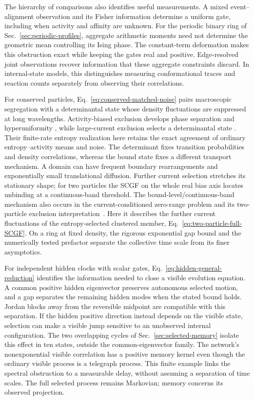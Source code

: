 \documentclass[aps,pre,reprint,amsmath,amssymb,longbibliography,floatfix]{revtex4-2}
\begin{document}
The hierarchy of comparisons also identifies useful measurements. A
mixed event--alignment observation and its Fisher information determine
a uniform gate, including when activity and affinity are unknown.
For the periodic binary ring of Sec.~\ref{sec:periodic-profiles}, aggregate
arithmetic moments need not determine the geometric mean controlling
its Ising phase. The constant-term
deformation makes this obstruction exact while keeping the gates real
and positive. Edge-resolved joint observations recover information that
these aggregate constraints discard. In internal-state models, this
distinguishes measuring conformational traces and reaction counts
separately from observing their correlations.

For conserved particles, Eq.~\eqref{eq:conserved-matched-noise} pairs
macroscopic segregation with a determinantal state whose density
fluctuations are suppressed at long wavelengths. Activity-biased exclusion develops phase separation and hyperuniformity
\cite{LecomteGarrahanVanWijland2012,JackThompsonSollich2015}, while
large-current exclusion selects a determinantal state
\cite{PopkovSchutzSimon2010}.
Their finite-rate entropy realization here retains the exact agreement
of ordinary entropy--activity means and noise. The determinant fixes
transition probabilities and density correlations, whereas the bound
state fixes a different transport mechanism. A domain can have frequent
boundary rearrangements and exponentially small translational diffusion.
Further current selection stretches its stationary shape; for two
particles the SCGF on the whole real bias axis locates unbinding at a
continuous-band threshold. The bound-level/continuous-band mechanism also occurs in the
current-conditioned zero-range problem and its two-particle exclusion
interpretation~\cite{RakosHarris2008}. Here it describes the further
current fluctuations of the entropy-selected clustered member,
Eq.~\eqref{eq:two-particle-full-SCGF}. On a ring at fixed density,
the rigorous exponential gap bound and the numerically tested prefactor
separate the collective time scale from its finer asymptotics.

For independent hidden clocks with scalar gates,
Eq.~\eqref{eq:hidden-general-reduction} identifies the information needed
to close a visible evolution equation. A common positive hidden eigenvector
preserves autonomous selected motion, and a gap separates the remaining
hidden modes when the stated bound holds. Jordan blocks away from the
reversible midpoint are compatible with this separation. If the hidden
positive direction instead depends on the visible state, selection can
make a visible jump sensitive to an unobserved internal configuration.
The two overlapping cycles of Sec.~\ref{sec:selected-memory} isolate
this effect in ten states, outside the common-eigenvector family. The network's nonexponential
visible correlation has a positive memory kernel even though the
ordinary visible process is a telegraph process. This finite example
links the spectral obstruction to a measurable delay, without assuming
a separation of time scales. The full selected process remains Markovian;
memory concerns its observed projection.
\end{document}

